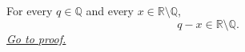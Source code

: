 \begin{lemma}
\label{lem:rational-minus-irrational-is-irrational}
For every $q\in\mathbb{Q}$ and every $x\in\mathbb{R}\setminus\mathbb{Q}$,
\[
  q-x\in\mathbb{R}\setminus\mathbb{Q}.
\]
\hyperref[prf:rational-minus-irrational-is-irrational]{\textit{Go to proof.}}
\end{lemma}